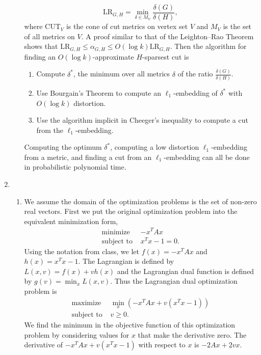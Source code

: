 \documentclass{article}
\newcommand{\CUT}{\mathrm{CUT}}
\newcommand{\LR}{\mathrm{LR}}
\newcommand{\0}{\mathbf{0}}
\begin{document}
\begin{enumerate}
\begin{enumerate}
\begin{equation*}
      \LR_{G, H} = \min_{\delta \in M_V} \frac{\delta(G)}{\delta(H)},
    \end{equation*}
    where $\CUT_V$ is the cone of cut metrics on vertex set $V$ and $M_V$ is the set of all metrics on $V$.
    A proof similar to that of the Leighton--Rao Theorem shows that $\LR_{G, H} \leq \alpha_{G, H} \leq O(\log k) \LR_{G, H}$.
    Then the algorithm for finding an $O(\log k)$-approximate $H$-sparsest cut is
    \begin{enumerate}
    \item Compute $\delta^*$, the minimum over all metrics $\delta$ of the ratio $\frac{\delta(G)}{\delta(H)}$.
    \item Use Bourgain's Theorem to compute an $\ell_1$-embedding of $\delta^*$ with $O(\log k)$ distortion.
    \item Use the algorithm implicit in Cheeger's inequality to compute a cut from the $\ell_1$-embedding.
    \end{enumerate}
    Computing the optimum $\delta^*$, computing a low distortion $\ell_1$-embedding from a metric, and finding a cut from an $\ell_1$-embedding can all be done in probabilistic polynomial time.
  \end{enumerate}
\item
  \begin{enumerate}
  \item
    We assume the domain of the optimization problems is the set of non-zero real vectors.
    First we put the original optimization problem into the equivalent minimization form,
    \begin{align*}
      \text{minimize } & -x^T A x \\
      \text{subject to } & x^T x - 1 = 0.
    \end{align*}
    Using the notation from class, we let $f(x) = -x^T A x$ and $h(x) = x^T x - 1$.
    The Lagrangian is defined by $L(x, v) = f(x) + v h(x)$ and the Lagrangian dual function is defined by $g(v) = \min_x L(x, v)$.
    Thus the Lagrangian dual optimization problem is
    \begin{align*}
      \text{maximize } & \min_{x} \left(-x^T A x + v \left(x^T x - 1\right)\right) \\
      \text{subject to } & v \geq 0.
    \end{align*}
    We find the minimum in the objective function of this optimization problem by considering values for $x$ that make the derivative zero.
    The derivative of $-x^T A x + v \left(x^T x - 1\right)$ with respect to $x$ is $-2 A x + 2 v x$.

\end{enumerate}
\end{enumerate}
\end{document}
